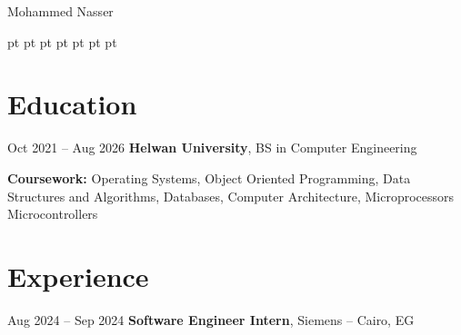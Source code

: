 \begin{header}
    \fontsize{25 pt}{25 pt}\selectfont Mohammed Nasser

    \normalsize
     pt%
    \mbox{}%
     pt%
    \AND%
     pt%
    \mbox{}%
     pt%
    \AND%
     pt%
    \mbox{}%
     pt%
    \AND%
     pt%
    \mbox{}%
\end{header}

\section{Education}




\begin{twocolentry}{
        Oct 2021 – Aug 2026
    }
    \textbf{Helwan University}, BS in Computer Engineering\end{twocolentry}

\vspace{0.10 cm}
\begin{onecolentry}
    \begin{highlights}
        \item \textbf{Coursework:} Operating Systems, Object Oriented Programming, Data Structures and Algorithms, Databases, Computer Architecture, Microprocessors Microcontrollers
    \end{highlights}
\end{onecolentry}

\section{Experience}

\begin{twocolentry}{
        Aug 2024 – Sep 2024
    }
    \textbf{Software Engineer Intern}, Siemens -- Cairo, EG\end{twocolentry}

